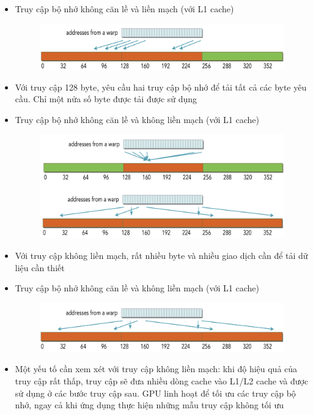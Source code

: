 \documentclass[14pt, a4paper]{article}
\numberwithin{equation}{section}
\numberwithin{figure}{section}
\numberwithin{dl}{section}
\numberwithin{md}{section}
\numberwithin{bd}{section}
\numberwithin{dn}{section}
\numberwithin{hq}{section}
\begin{document}
\begin{itemize}
    \item Truy cập bộ nhớ không căn lề và liền mạch (với L1 cache)
    \begin{figure}[H]
            \centering
            \includegraphics[width=0.7\linewidth]{figures/CUDA/Misaligned_Coalesced_Global_Memory_Transaction.png}
    \end{figure}
    \item Với truy cập 128 byte, yêu cầu hai truy cập bộ nhớ để tải tất cả các byte yêu cầu.
    Chỉ một nửa số byte được tải được sử dụng
\end{itemize}


\begin{itemize}
    \item Truy cập bộ nhớ không căn lề và không liền mạch (với L1 cache)
    \begin{figure}[H]
        \centering
        \includegraphics[width=0.7\linewidth]{figures/CUDA/Misaligned_Uncoalesced_Global_Memory_Transaction.png}
    \end{figure}
    \item Với truy cập không liền mạch, rất nhiều byte và nhiều giao dịch cần để tải dữ liệu cần thiết
\end{itemize}


\begin{itemize}
    \item Truy cập bộ nhớ không căn lề và không liền mạch (với L1 cache)
    \begin{figure}[H]
        \centering
        \includegraphics[width=0.7\linewidth]{figures/CUDA/Misaligned_Uncoalesced_Global_Memory_Transaction_2.png}
    \end{figure}
    \item Một yếu tố cần xem xét với truy cập không liền mạch: khi độ hiệu quả của truy cập rất thấp, truy cập sẽ đưa nhiều dòng cache vào L1/L2 cache và được sử dụng ở các bước truy cập sau.
    GPU linh hoạt để tối ưu các truy cập bộ nhớ, ngay cả khi ứng dụng thực hiện những mẫu truy cập không tối ưu
\end{itemize}
\end{document}
